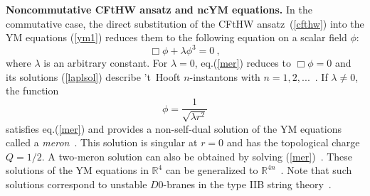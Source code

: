 \documentclass[a4paper,11pt]{article}
\numberwithin{equation}{section}
\def\l{\lambda}
\def\p{\phi}
\newcommand{\rc}{{\mathbb{R}^4}}
\newcommand{\R}{{\mathbb{R}}}
\begin{document}
{\bf Noncommutative CFtHW ansatz and ncYM equations.}
In the commutative case, the direct substitution of the CFtHW ansatz~(\ref{cfthw})
into the YM equations (\ref{ym1}) reduces them to the following equation
on a scalar field $\p$:
\begin{equation}\label{mer}
\Box\p + \l\p^3 =0\ ,
\end{equation}
where $\l$ is an arbitrary constant. For $\l =0$, eq.(\ref{mer}) reduces to 
$\Box\p =0$ and its solutions (\ref{laplsol}) describe 't~Hooft $n$-instantons 
 with $n=1,2,...$\ . If $\l\ne 0$, the function  
\begin{equation}\label{me}
\p =\frac{1}{\sqrt{\l r^2}}
\end{equation}
satisfies eq.(\ref{mer}) and provides a non-self-dual solution of the YM equations 
called a {\it meron}~\cite{AFF, Callan}. This solution is singular at $r=0$ and has the
topological charge $Q=1/2$. A two-meron solution can also be obtained by solving 
(\ref{mer})~\cite{AFF, Callan, Actor}. These solutions of the YM equations in $\rc$ 
can be generalized to $\R^{4n}$~\cite{Popov}. Note that such solutions correspond
to unstable $D$0-branes in the type IIB string theory~\cite{Druk}.
\end{document}
